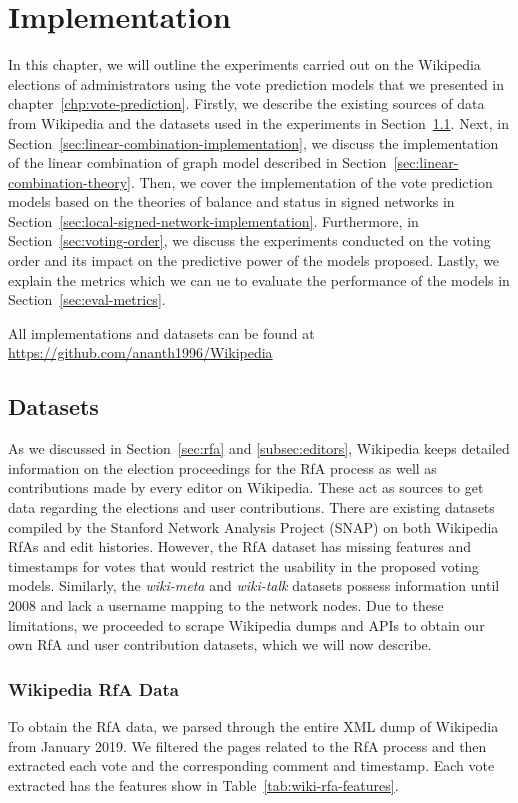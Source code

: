 \chapter{Implementation}
\label{chp:implementation}
In this chapter, we will outline the experiments carried out on the Wikipedia elections of administrators using the vote prediction models that we presented in chapter~\ref{chp:vote-prediction}.
Firstly, we describe the existing sources of data from Wikipedia and the datasets used in the experiments in Section~\ref{sec:datasets}.
Next, in Section~\ref{sec:linear-combination-implementation}, we discuss the implementation of the linear combination of graph model described in Section~\ref{sec:linear-combination-theory}.
Then, we cover the implementation of the vote prediction models based on the theories of balance and status in signed networks in Section~\ref{sec:local-signed-network-implementation}.
Furthermore, in Section~\ref{sec:voting-order}, we discuss the experiments conducted on the voting order and its impact on the predictive power of the models proposed.
Lastly, we explain the metrics which we can ue to evaluate the performance of the models in Section~\ref{sec:eval-metrics}.

All implementations and datasets can be found at \url{https://github.com/ananth1996/Wikipedia}
\section{Datasets}
\label{sec:datasets}
As we discussed in Section~\ref{sec:rfa} and \ref{subsec:editors}, Wikipedia keeps detailed information on the election proceedings for the RfA process as well as contributions made by every editor on Wikipedia.
These act as sources to get data regarding the elections and user contributions. There are existing datasets compiled by the Stanford Network Analysis Project (SNAP) \cite{snapnets} on both Wikipedia RfAs and edit histories.
However, the RfA dataset has missing features and timestamps for votes that would restrict the usability in the proposed voting models.
Similarly, the \textit{wiki-meta} and \textit{wiki-talk} datasets possess information until 2008 and lack a username mapping to the network nodes.
Due to these limitations, we proceeded to scrape Wikipedia dumps and APIs to obtain our own RfA and user contribution datasets, which we will now describe.

\subsection{Wikipedia RfA Data}
To obtain the RfA data, we parsed through the entire XML dump of Wikipedia from January 2019.
We filtered the pages related to the RfA process and then extracted each vote and the corresponding comment and timestamp.
Each vote extracted has the features show in Table~\ref{tab:wiki-rfa-features}.

